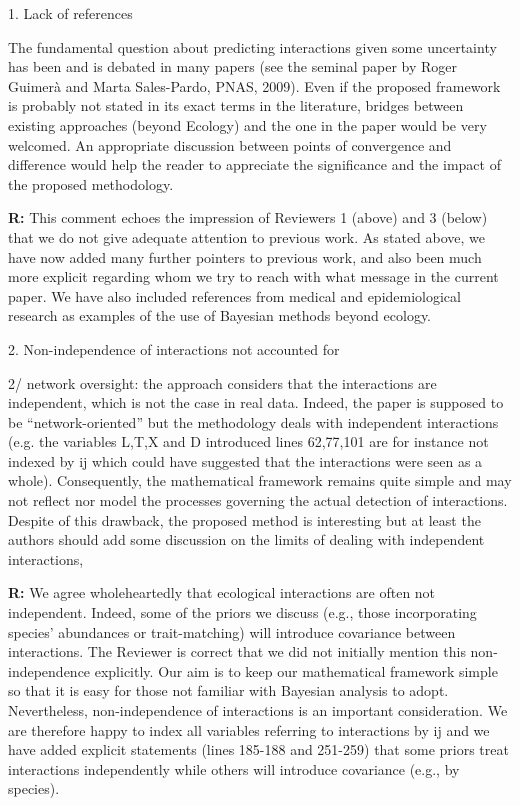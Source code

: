 \documentclass[12pt]{letter}
\newenvironment{refquote}{\bigskip \begin{it}}{\end{it}\smallskip}
\begin{document}
	1. Lack of references 


		\begin{refquote}
			
			The fundamental question about predicting interactions given some uncertainty has been and is debated in many papers (see the seminal paper by Roger Guimer\`{a} and Marta Sales-Pardo, PNAS, 2009). Even if the proposed framework is probably not stated in its exact terms in the literature, bridges between existing approaches (beyond Ecology) and the one in the paper would be very welcomed. An appropriate discussion between points of convergence and difference would help the reader to appreciate the significance and the impact of the proposed methodology.
		
		\end{refquote}


		\textbf{R:} This comment echoes the impression of Reviewers 1 (above) and 3 (below) that we do not give adequate attention to previous work. As stated above, we have now added many further pointers to previous work, and also been much more explicit regarding whom we try to reach with what message in the current paper. We have also included references from medical and epidemiological research as examples of the use of Bayesian methods beyond ecology. 


	2. Non-independence of interactions not accounted for 

		\begin{refquote}
			2/ network oversight: the approach considers that the interactions are independent, which is not the case in real data. Indeed, the paper is supposed to be ``network-oriented'' but the methodology deals with independent interactions (e.g. the variables L,T,X and D introduced lines 62,77,101 are for instance not indexed by ij which could have suggested that the interactions were seen as a whole). Consequently, the mathematical framework remains quite simple and may not reflect nor model the processes governing the actual detection of interactions. Despite of this drawback, the proposed method is interesting but at least the authors should add some discussion on the limits of dealing with independent interactions,
		\end{refquote}


		\textbf{R:} We agree wholeheartedly that ecological interactions are often not independent. Indeed, some of the priors we discuss (e.g., those incorporating species' abundances or trait-matching) will introduce covariance between interactions. The Reviewer is correct that we did not initially mention this non-independence explicitly. Our aim is to keep our mathematical framework simple so that it is easy for those not familiar with Bayesian analysis to adopt. Nevertheless, non-independence of interactions is an important consideration. We are therefore happy to index all variables referring to interactions by ij and we have added explicit statements (lines 185-188 and 251-259) that some priors treat interactions independently while others will introduce covariance (e.g., by species). 
\end{document}

